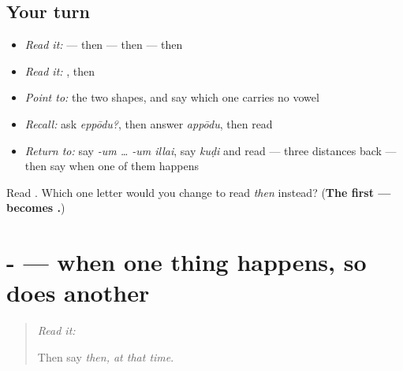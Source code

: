 \subsection*{Your turn}
\begin{itemize}
\raggedright
  \item \emph{Read it:} \textbf{} — then \textbf{} — then \textbf{} — then \textbf{}
  \item \emph{Read it:} \textbf{}, then \textbf{}
  \item \emph{Point to:} the two  shapes, and say which one carries no vowel
  \item \emph{Recall:} ask \emph{eppōdu?}, then answer \emph{appōdu}, then read \textbf{}
  \item \emph{Return to:} say \emph{-um … -um illai}, say \emph{kuḍi} and read \textbf{} — three distances back — then say when one of them happens
\end{itemize}

\begin{tcolorbox}[breakable,colback=teal!4,colframe=teal!35!black,title={Before you move on}]
Read \textbf{}. Which one letter would you change to read \emph{then} instead? (\textbf{The first —  becomes .})
\end{tcolorbox}
\section[\texorpdfstring{-\ta{உம்} \ta{போது} (-um pōdu)}{-உம் போது (-um pōdu)}]{-  — when one thing happens, so does another}

\label{lesson:TA-C79-when-clause}



\begin{quote}
\emph{Read it:} \textbf{}

Then say \emph{then, at that time}.
\end{quote}

